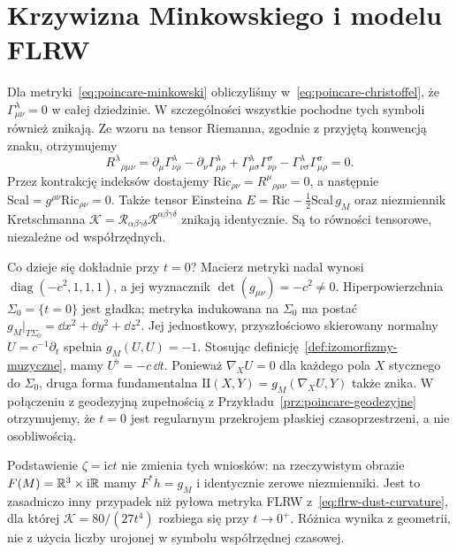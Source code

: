 \section{Krzywizna Minkowskiego i modelu FLRW}
\label{sec:krzywizna-minkowski-flrw}

\begin{przyklad}[krzywizna Poincarégo i regularność przy $t=0$]
\label{prz:poincare-krzywizna}
Dla metryki~\eqref{eq:poincare-minkowski} obliczyliśmy
w~\eqref{eq:poincare-christoffel}, że
$\Gamma^\lambda_{\mu\nu}=0$ w całej dziedzinie.
W szczególności wszystkie pochodne tych symboli
również znikają. Ze wzoru na tensor Riemanna,
zgodnie z przyjętą konwencją znaku, otrzymujemy
\begin{equation}\label{eq:poincare-riemann-zero}
 R^\lambda{}_{\rho\mu\nu}
 =\partial_\mu\Gamma^\lambda_{\nu\rho}
 -\partial_\nu\Gamma^\lambda_{\mu\rho}
 +\Gamma^\lambda_{\mu\sigma}\Gamma^\sigma_{\nu\rho}
 -\Gamma^\lambda_{\nu\sigma}\Gamma^\sigma_{\mu\rho}
 =0.
\end{equation}
Przez kontrakcję indeksów dostajemy
$\mathrm{Ric}_{\rho\nu}=R^\mu{}_{\rho\mu\nu}=0$,
a następnie $\mathrm{Scal}=g^{\rho\nu}\mathrm{Ric}_{\rho\nu}=0$.
Także tensor Einsteina
$E=\mathrm{Ric}-\frac12\mathrm{Scal}\,g_M$ oraz
niezmiennik Kretschmanna
$\mathcal K=\mathcal R_{\alpha\beta\gamma\delta}
 \mathcal R^{\alpha\beta\gamma\delta}$ znikają identycznie.
Są to równości tensorowe, niezależne od współrzędnych.

Co dzieje się dokładnie przy $t=0$?
Macierz metryki nadal wynosi
$\operatorname{diag}(-c^2,1,1,1)$, a jej wyznacznik
$\det(g_{\mu\nu})=-c^2\ne0$.
Hiperpowierzchnia $\Sigma_0=\{t=0\}$ jest gładka;
metryka indukowana na $\Sigma_0$ ma postać
$g_M|_{T\Sigma_0}=\dd x^2+\dd y^2+\dd z^2$.
Jej jednostkowy, przyszłościowo skierowany normalny
$U=c^{-1}\partial_t$ spełnia $g_M(U,U)=-1$.
Stosując definicję~\ref{def:izomorfizmy-muzyczne},
mamy $U^\flat=-c\,\dd t$.
Ponieważ $\nabla_XU=0$ dla każdego pola $X$
stycznego do $\Sigma_0$, druga forma fundamentalna
$\mathrm{II}(X,Y)=g_M(\nabla_XU,Y)$ także znika.
W połączeniu z geodezyjną zupełnością z
Przykładu~\ref{prz:poincare-geodezyjne} otrzymujemy,
że $t=0$ jest regularnym przekrojem płaskiej
czasoprzestrzeni, a nie osobliwością.

Podstawienie $\zeta=\mathrm{i}ct$ nie zmienia tych
wniosków: na rzeczywistym obrazie
$F(M)=\mathbb{R}^3\times\mathrm{i}\mathbb{R}$ mamy
$F^*h=g_M$ i identycznie zerowe niezmienniki.
Jest to zasadniczo inny przypadek niż pyłowa metryka
FLRW z~\eqref{eq:flrw-dust-curvature}, dla której
$\mathcal K=80/(27t^4)$ rozbiega się przy $t\to0^+$.
Różnica wynika z geometrii, nie z użycia liczby
urojonej w symbolu współrzędnej czasowej.
\end{przyklad}

